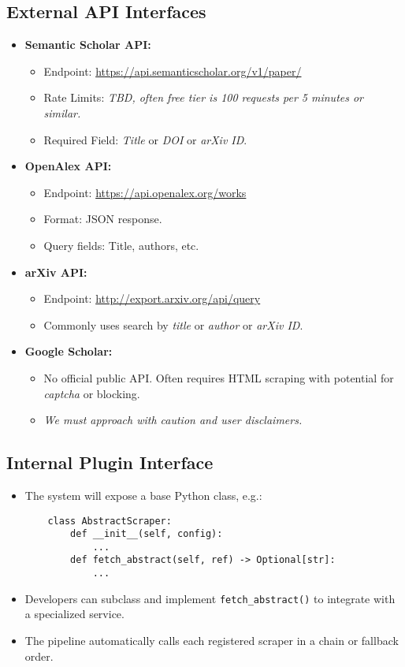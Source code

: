\documentclass[12pt]{article}
\begin{document}
\subsection{External API Interfaces}
\begin{itemize}
  \item \textbf{Semantic Scholar API:} 
  \begin{itemize}
    \item Endpoint: \url{https://api.semanticscholar.org/v1/paper/}
    \item Rate Limits: \emph{TBD, often free tier is 100 requests per 5 minutes or similar.}
    \item Required Field: \emph{Title} or \emph{DOI} or \emph{arXiv ID}.
  \end{itemize}
  \item \textbf{OpenAlex API:}
  \begin{itemize}
    \item Endpoint: \url{https://api.openalex.org/works}
    \item Format: JSON response. 
    \item Query fields: Title, authors, etc. 
  \end{itemize}
  \item \textbf{arXiv API:} 
  \begin{itemize}
    \item Endpoint: \url{http://export.arxiv.org/api/query}
    \item Commonly uses search by \emph{title} or \emph{author} or \emph{arXiv ID}.
  \end{itemize}
  \item \textbf{Google Scholar:}
  \begin{itemize}
    \item No official public API. Often requires HTML scraping with potential for \emph{captcha} or blocking. 
    \item \emph{We must approach with caution and user disclaimers.}
  \end{itemize}
\end{itemize}

\subsection{Internal Plugin Interface}
\begin{itemize}
  \item The system will expose a base Python class, e.g.:
  \begin{verbatim}
    class AbstractScraper:
        def __init__(self, config):
            ...
        def fetch_abstract(self, ref) -> Optional[str]:
            ...
  \end{verbatim}
  \item Developers can subclass and implement \verb|fetch_abstract()| to integrate with a specialized service.
  \item The pipeline automatically calls each registered scraper in a chain or fallback order.
\end{itemize}
\end{document}
